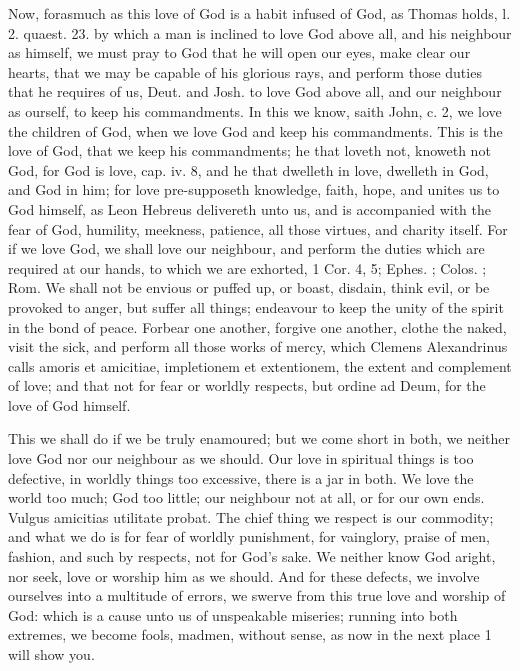 {Now, forasmuch as this love of God is a habit infused of God, as 
Thomas holds, l. 2. quaest. 23. by which a man is inclined to love God
above all, and his neighbour as himself, we must pray to God that he
will open our eyes, make clear our hearts, that we may be capable of
his glorious rays, and perform those duties that he requires of us,
Deut.  and Josh.  to love God above all, and our neighbour as
ourself, to keep his commandments. In this we know, saith John, c. 
2, we love the children of God, when we love God and keep his
commandments. This is the love of God, that we keep his commandments;
he that loveth not, knoweth not God, for God is love, cap. iv. 8, and
he that dwelleth in love, dwelleth in God, and God in him; for love
pre-supposeth knowledge, faith, hope, and unites us to God himself, as
Leon Hebreus delivereth unto us, and is accompanied with the fear
of God, humility, meekness, patience, all those virtues, and charity
itself. For if we love God, we shall love our neighbour, and perform
the duties which are required at our hands, to which we are exhorted, 1
Cor.  4, 5; Ephes. ; Colos. ; Rom.  We shall not be
envious or puffed up, or boast, disdain, think evil, or be provoked to
anger, but suffer all things; endeavour to keep the unity of the spirit
in the bond of peace. Forbear one another, forgive one another, clothe
the naked, visit the sick, and perform all those works of mercy, which
Clemens Alexandrinus calls amoris et amicitiae, impletionem et
extentionem, the extent and complement of love; and that not for fear
or worldly respects, but ordine ad Deum, for the love of God himself.

This we shall do if we be truly enamoured; but we come short in both,
we neither love God nor our neighbour as we should. Our love in
spiritual things is too defective, in worldly things too
excessive, there is a jar in both. We love the world too much; God too
little; our neighbour not at all, or for our own ends. Vulgus amicitias
utilitate probat. The chief thing we respect is our commodity; and what
we do is for fear of worldly punishment, for vainglory, praise of men,
fashion, and such by respects, not for God's sake. We neither know God
aright, nor seek, love or worship him as we should. And for these
defects, we involve ourselves into a multitude of errors, we swerve
from this true love and worship of God: which is a cause unto us of
unspeakable miseries; running into both extremes, we become fools,
madmen, without sense, as now in the next place 1 will show you.

}
